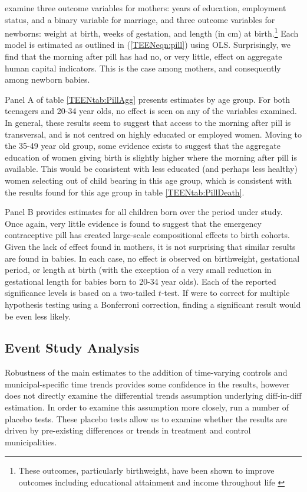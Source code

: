 \Person examine three outcome variables for mothers: years of education, 
employment status, and a binary variable for marriage, and three outcome variables
for newborns: weight at birth, weeks of gestation, and length (in cm) at 
birth.\footnote{These outcomes, particularly birthweight, have been shown to
improve outcomes including educational attainment and income throughout life 
\citep{BehrmanRosenzweig2004}}  Each model is estimated as outlined in 
(\ref{TEENeqn:pill}) using OLS.  Surprisingly, we find that the morning after
pill has had no, or very little, effect on aggregate human capital indicators.
This is the case among mothers, and consequently among newborn babies.

Panel A of table \ref{TEENtab:PillAgg} presents estimates by age group.  For
both teenagers and 20-34 year olds, no effect is seen on any of the variables
examined. In general, these results seem to suggest that access to the morning 
after pill is transversal, and is not centred on highly educated or employed 
women.  Moving to the 35-49 year old group, some evidence exists to suggest
that the aggregate education of women giving birth is slightly higher where
the morning after pill is available.  This would be consistent with less
educated (and perhaps less healthy) women selecting out of child bearing in
this age group, which is consistent with the results found for this age group
in table \ref{TEENtab:PillDeath}.

Panel B provides estimates for all children born over the period under study.
Once again, very little evidence is found to suggest that the emergency 
contraceptive pill has created large-scale compositional effects to birth
cohorts.  Given the lack of effect found in mothers, it is not surprising
that similar results are found in babies.  In each case, no effect is observed
on birthweight, gestational period, or length at birth (with the exception
of a very small reduction in gestational length for babies born to 20-34 year
olds).  Each of the reported significance levels is based on a two-tailed 
$t$-test.  If \person were to correct for multiple hypothesis testing using a
Bonferroni correction, finding a significant result would be even less likely.


\subsection{Event Study Analysis}
\label{TEENsscn:eventstudy}
Robustness of the main estimates to the addition of time-varying controls and
municipal-specific time trends provides some confidence in the results, however 
does not directly examine the differential trends assumption underlying 
diff-in-diff estimation.  In order to examine this assumption more closely, 
\person run a number of placebo tests.  These placebo tests allow us to examine
whether the results are driven by pre-existing differences or trends in treatment
and control municipalities. 

